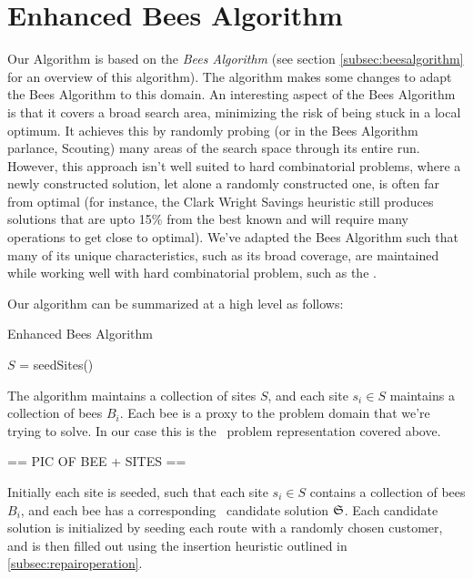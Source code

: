 \section{Enhanced Bees Algorithm}

Our Algorithm is based on the \emph{Bees Algorithm} (see section \ref{subsec:beesalgorithm} for an overview of this algorithm). The algorithm makes some changes to adapt the Bees Algorithm to this domain. An interesting aspect of the Bees Algorithm is that it covers a broad search area, minimizing the risk of being stuck in a local optimum. It achieves this by randomly probing (or in the Bees Algorithm parlance, Scouting) many areas of the search space through its entire run. However, this approach isn't well suited to hard combinatorial problems, where a newly constructed solution, let alone a randomly constructed one, is often far from optimal (for instance, the Clark Wright Savings heuristic still produces solutions that are upto 15\% from the best known and will require many operations to get close to optimal). We've adapted the Bees Algorithm such that many of its unique characteristics, such as its broad coverage, are maintained while working well with hard combinatorial problem, such as the \VRP.

Our algorithm can be summarized at a high level as follows:

\begin{algorithm}[H]
   \caption{Enhanced Bees Algorithm}
   $S$ = seedSites() \\

\end{algorithm}

The algorithm maintains a collection of sites $S$, and each site $s_i \in S$ maintains a collection of bees $B_i$. Each bee is a proxy to the problem domain that we're trying to solve. In our case this is the \VRP\ problem representation covered above.

== PIC OF BEE + SITES ==

Initially each site is seeded, such that each site $s_i \in S$ contains a collection of bees $B_i$, and each bee has a corresponding \VRP\ candidate solution $\mathfrak{S}$. Each candidate solution is initialized by seeding each route with a randomly chosen customer, and is then filled out using the insertion heuristic outlined in \ref{subsec:repairoperation}.

